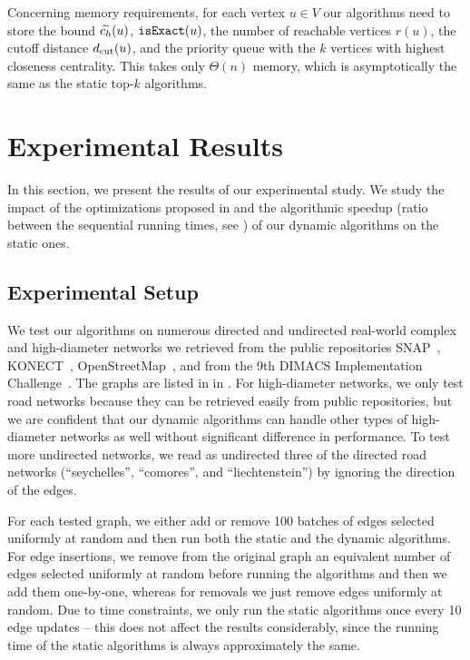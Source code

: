 Concerning memory requirements, for each vertex $u \in V$ our algorithms need
to store the bound $\widetilde{c_h}(u)$, $\texttt{isExact}(u)$, the number of reachable vertices
$r(u)$, the cutoff distance $d_{\text{cut}}(u)$, and the \topk priority queue with the
$k$ vertices with highest closeness centrality. This takes only $\Theta(n)$ memory,
which is asymptotically the same as the static top-$k$ algorithms.

\section{Experimental Results}
\label{sec:topk-clos-experimental-results}
%
In this section, we present the results of our experimental study. We study the
impact of the optimizations proposed in 
and the algorithmic speedup (ratio between the sequential running times,
see ) of our
dynamic algorithms on the static ones.

\subsection{Experimental Setup}
%
We test our algorithms on numerous directed and undirected real-world complex
and high-diameter networks we retrieved from the public repositories
SNAP~\cite{snapnets}, KONECT~\cite{kunegis2013konect},
OpenStreetMap~\cite{OpenStreetMap}, and from
the 9th DIMACS Implementation Challenge~\cite{demetrescu2009shortest}.
The graphs are listed in
 in
.
%
For high-diameter networks, we only test road networks because they can be
retrieved easily from public repositories, but we are confident that our
dynamic algorithms can handle other types of high-diameter networks as well
without significant difference in performance. To test more undirected
networks, we read as undirected three of the directed road networks
(\enquote{seychelles}, \enquote{comores}, and \enquote{liechtenstein}) by
ignoring the direction of the edges.

For each tested graph, we either add or remove 100 batches of edges selected
uniformly at random and then run both the static and the dynamic algorithms.
For edge insertions, we remove from the original graph an equivalent number of edges
selected uniformly at random before running the algorithms and then we add them
one-by-one, whereas for removals we just remove edges uniformly at random.
Due to time constraints, we only run the static algorithms once every 10 edge
updates -- this does not affect the results considerably, since the running
time of the static algorithms is always approximately the same.

